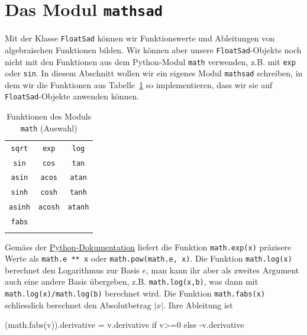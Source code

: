 \documentclass[
  a4paper,
  DIV=11]{scrreprt}
\newenvironment{Shaded}{\begin{snugshade}}{\end{snugshade}}
\newcommand{\ControlFlowTok}[1]{\textcolor[rgb]{0.00,0.23,0.31}{#1}}
\newcommand{\DecValTok}[1]{\textcolor[rgb]{0.68,0.00,0.00}{#1}}
\newcommand{\NormalTok}[1]{\textcolor[rgb]{0.00,0.23,0.31}{#1}}
\newcommand{\OperatorTok}[1]{\textcolor[rgb]{0.37,0.37,0.37}{#1}}
\theoremstyle{definition}
\theoremstyle{definition}
\theoremstyle{remark}
\begin{document}
\hypertarget{sec-modulMathSad}{%
\section{\texorpdfstring{Das Modul
\texttt{mathsad}}{Das Modul mathsad}}\label{sec-modulMathSad}}

Mit der Klasse \texttt{FloatSad} können wir Funktionswerte und
Ableitungen von algebraischen Funktionen bilden. Wir können aber unsere
\texttt{FloatSad}-Objekte noch nicht mit den Funktionen aus dem
Python-Modul \texttt{math} verwenden, z.B. mit \texttt{exp} oder
\texttt{sin}. In diesem Abschnitt wollen wir ein eigenes Modul
\texttt{mathsad} schreiben, in dem wir die Funktionen aus
Tabelle~\ref{tbl-mathFunctions} so implementieren, dass wir sie auf
\texttt{FloatSad}-Objekte anwenden können.

\hypertarget{tbl-mathFunctions}{}
\begin{longtable}[]{@{}ccc@{}}
\toprule\noalign{}
\endfirsthead
\endhead
\bottomrule\noalign{}
\endlastfoot
\texttt{sqrt} & \texttt{exp} & \texttt{log} \\
\texttt{sin} & \texttt{cos} & \texttt{tan} \\
\texttt{asin} & \texttt{acos} & \texttt{atan} \\
\texttt{sinh} & \texttt{cosh} & \texttt{tanh} \\
\texttt{asinh} & \texttt{acosh} & \texttt{atanh} \\
\texttt{fabs} & & \\
\caption{\label{tbl-mathFunctions}Funktionen des Moduls \texttt{math}
(Auswahl)}\tabularnewline
\end{longtable}

Gemäss der
\href{https://docs.python.org/3.8/library/math.html}{Python-Dokumentation}
liefert die Funktion \texttt{math.exp(x)} präzisere Werte als
\texttt{math.e\ **\ x} oder \texttt{math.pow(math.e,\ x)}. Die Funktion
\texttt{math.log(x)} berechnet den Logarithmus zur Basis \(e\), man kann
ihr aber als zweites Argument auch eine andere Basis übergeben, z.B.
\texttt{math.log(x,b)}, was dann mit \texttt{math.log(x)/math.log(b)}
berechnet wird. Die Funktion \texttt{math.fabs(x)} schliesslich
berechnet den Absolutbetrag \(|x|\). Ihre Ableitung ist

\begin{Shaded}
\begin{Highlighting}[]
\NormalTok{(math.fabs(v)).derivative }\OperatorTok{=}\NormalTok{ v.derivative }\ControlFlowTok{if}\NormalTok{ v}\OperatorTok{\textgreater{}=}\DecValTok{0} \ControlFlowTok{else} \OperatorTok{{-}}\NormalTok{v.derivative}
\end{Highlighting}
\end{Shaded}
\end{document}
